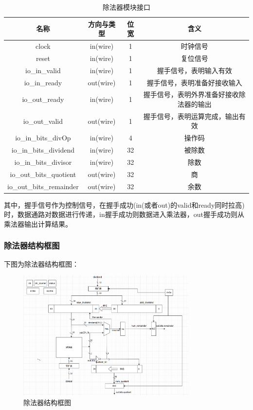 \documentclass[11pt]{article}
\begin{document}
\begin{table}[H]
    \centering
    \begin{tabular}{cccc}\hline
        名称                  & 方向与类型 & 位宽 & 含义                                    \\ \hline
        clock                 & in(wire)   & 1    & 时钟信号                                \\
        reset                 & in(wire)   & 1    & 复位信号                                \\ \hline
        io_in_valid           & in(wire)   & 1    & 握手信号，表明输入有效                  \\
        io_in_ready           & out(wire)  & 1    & 握手信号，表明准备好接收输入            \\
        io_out_ready          & in(wire)   & 1    & 握手信号，表明外界准备好接收除法器的输出\\
        io_out_valid          & out(wire)  & 1    & 握手信号，表明运算完成，输出有效        \\ \hline
        io_in_bits_divOp      & in(wire)   & 4    & 操作码                            \\
        io_in_bits_dividend   & in(wire)   & 32   & 被除数                                  \\
        io_in_bits_divisor    & in(wire)   & 32   & 除数                                    \\
        io_out_bits_quotient  & out(wire)  & 32   & 商                                      \\
        io_out_bits_remainder & out(wire)  & 32   & 余数                                    \\ \hline
    \end{tabular}
    \caption{除法器模块接口}
\end{table}

其中，握手信号作为控制信号，在握手成功(in(或者out)的valid和ready同时拉高)时，数据通路对数据进行传递，in握手成功则数据进入乘法器，out握手成功则从乘法器输出计算结果。

\subsubsection{除法器结构框图}
下图为除法器结构框图：
\begin{figure}[H]
    \centering
    \includegraphics[width=0.8\textwidth]{fig/取法器.png}
    \caption{除法器结构框图}
\end{figure}
\end{document}
